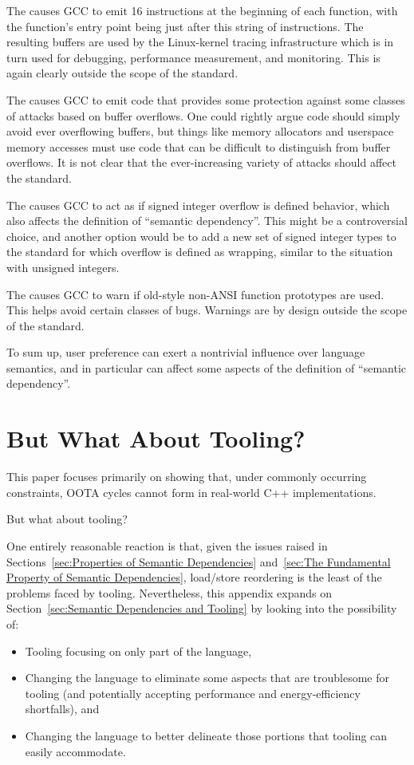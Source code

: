 \documentclass[10]{article}
\begin{document}
The  causes GCC to emit 16
 instructions at the beginning of each function, with
the function's entry point being just after this string of 
instructions.
The resulting buffers are used by the Linux-kernel tracing infrastructure
which is in turn used for debugging, performance measurement, and
monitoring.
This is again clearly outside the scope of the standard.

The  causes GCC to emit code that provides
some protection against some classes of attacks based on buffer overflows.
One could rightly argue code should simply avoid ever overflowing buffers,
but things like memory allocators and userspace memory accesses must
use code that can be difficult to distinguish from buffer overflows.
It is not clear that the ever-increasing variety of attacks should
affect the standard.

The  causes GCC to act as if signed integer
overflow is defined behavior,
which also affects the definition of ``semantic dependency''.
This might be a controversial choice, and another option would be to add
a new set of signed integer types to the standard for which overflow is
defined as wrapping, similar to the situation with unsigned integers.

The  causes GCC to warn if old-style
non-ANSI function prototypes are used.
This helps avoid certain classes of bugs.
Warnings are by design outside the scope of the standard.

To sum up, user preference can exert a nontrivial influence over
language semantics, and in particular can affect some aspects of the
definition of ``semantic dependency''.

\clearpage

\section{But What About Tooling?}
\label{sec:But What About Tooling?}

This paper focuses primarily on showing that, under commonly occurring
constraints, OOTA cycles cannot form in real-world C++ implementations.

But what about tooling?

One entirely reasonable reaction is that, given the issues raised in
Sections~\ref{sec:Properties of Semantic Dependencies}
and~\ref{sec:The Fundamental Property of Semantic Dependencies},
load/store reordering is the least of the problems faced by tooling.
Nevertheless, this appendix expands on
Section~\ref{sec:Semantic Dependencies and Tooling}
by looking into the possibility of:
\begin{itemize}
\item	Tooling focusing on only part of the language,
\item	Changing the language to eliminate some aspects that are
	troublesome for tooling (and potentially accepting performance
	and energy-efficiency shortfalls), and
\item	Changing the language to better delineate those portions that
	tooling can easily accommodate.
\end{itemize}
\end{document}
